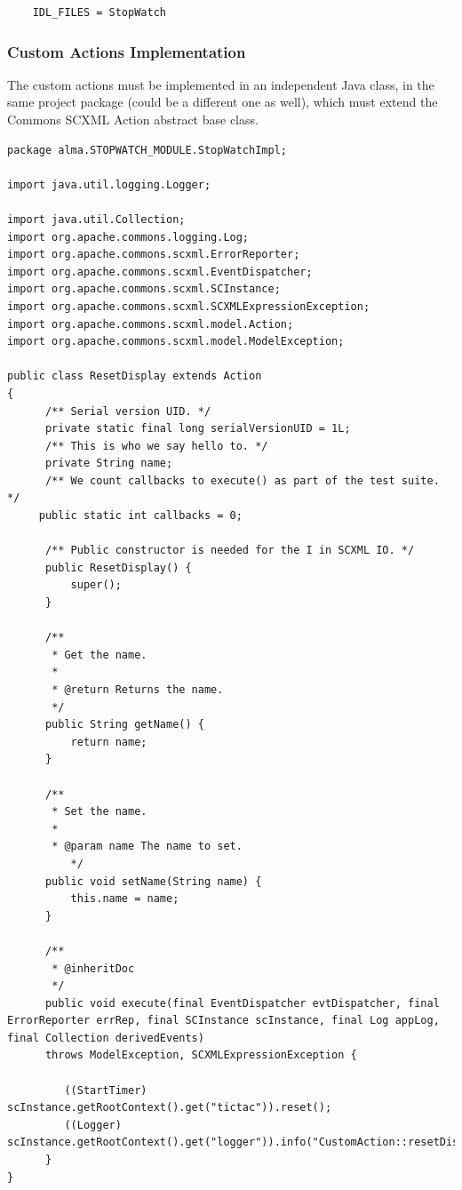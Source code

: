 \documentclass[]{article}
\begin{document}
\begin{lstlisting}
	IDL_FILES = StopWatch
\end{lstlisting}	

\subsubsection{Custom Actions Implementation}

The custom actions must be implemented in an independent Java class, in the same project package (could be a different one as well), which must extend the Commons SCXML Action abstract base class. 

\begin{lstlisting}
package alma.STOPWATCH_MODULE.StopWatchImpl;

import java.util.logging.Logger;

import java.util.Collection;
import org.apache.commons.logging.Log;
import org.apache.commons.scxml.ErrorReporter;
import org.apache.commons.scxml.EventDispatcher;
import org.apache.commons.scxml.SCInstance;
import org.apache.commons.scxml.SCXMLExpressionException;
import org.apache.commons.scxml.model.Action;
import org.apache.commons.scxml.model.ModelException;

public class ResetDisplay extends Action
{
      /** Serial version UID. */
      private static final long serialVersionUID = 1L;
      /** This is who we say hello to. */
      private String name;
      /** We count callbacks to execute() as part of the test suite. */
     public static int callbacks = 0;
 
      /** Public constructor is needed for the I in SCXML IO. */
      public ResetDisplay() {
          super();
      }
  
      /**
       * Get the name.
       *
       * @return Returns the name.
       */
      public String getName() {
          return name;
      }
  
      /**
       * Set the name.
       *
       * @param name The name to set.
          */
      public void setName(String name) {
          this.name = name;
      }
  
      /**
       * @inheritDoc
       */
      public void execute(final EventDispatcher evtDispatcher, final ErrorReporter errRep, final SCInstance scInstance, final Log appLog, final Collection derivedEvents)
      throws ModelException, SCXMLExpressionException {
        
         ((StartTimer) scInstance.getRootContext().get("tictac")).reset();
         ((Logger) scInstance.getRootContext().get("logger")).info("CustomAction::resetDisplay()");
      }
}
\end{lstlisting}	
\end{document}
